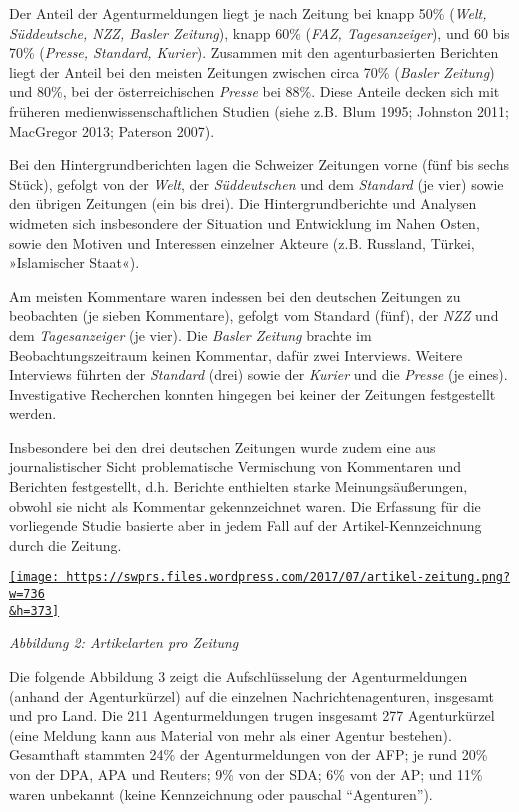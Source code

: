 Der Anteil der Agenturmeldungen liegt je nach Zeitung bei knapp 50\%
(\emph{Welt, Süddeutsche, NZZ, Basler Zeitung}), knapp 60\% (\emph{FAZ,
Tagesanzeiger}), und 60 bis 70\% (\emph{Presse, Standard, Kurier}).
Zusammen mit den agenturbasierten Berichten liegt der Anteil bei den
meisten Zeitungen zwischen circa 70\% (\emph{Basler Zeitung}) und 80\%,
bei der österreichischen \emph{Presse} bei 88\%. Diese Anteile decken
sich mit früheren medien­wissen­schaftlichen Studien (siehe z.B. Blum
1995; Johnston 2011; MacGregor 2013; Paterson 2007).

Bei den Hintergrundberichten lagen die Schweizer Zeitungen vorne (fünf
bis sechs Stück), gefolgt von der \emph{Welt}, der \emph{Süddeutschen}
und dem \emph{Standard} (je vier) sowie den übrigen Zeitungen (ein bis
drei). Die Hintergrundberichte und Analysen widmeten sich insbesondere
der Situation und Entwicklung im Nahen Osten, sowie den Motiven und
Interessen einzelner Akteure (z.B. Russland, Türkei, »Islamischer
Staat«).

Am meisten Kommentare waren indessen bei den deutschen Zeitungen zu
beobachten (je sieben Kommentare), gefolgt vom Standard (fünf), der
\emph{NZZ} und dem \emph{Tagesanzeiger} (je vier). Die \emph{Basler
Zeitung} brachte im Beobachtungszeitraum keinen Kommentar, dafür zwei
Interviews. Weitere Interviews führten der \emph{Standard} (drei) sowie
der \emph{Kurier} und die \emph{Presse} (je eines). Investigative
Recherchen konnten hingegen bei keiner der Zeitungen festgestellt
werden.

Insbesondere bei den drei deutschen Zeitungen wurde zudem eine aus
journalistischer Sicht problematische Vermischung von Kommentaren und
Berichten festgestellt, d.h. Berichte enthielten starke
Meinungs­äußerungen, obwohl sie nicht als Kommentar gekennzeichnet
waren. Die Erfassung für die vorliegende Studie basierte aber in jedem
Fall auf der Artikel-Kennzeichnung durch die Zeitung.

\href{https://swprs.files.wordpress.com/2017/07/artikel-zeitung.png}{\texttt{[image: https://swprs.files.wordpress.com/2017/07/artikel-zeitung.png?w=736\\\&h=373]}}

\emph{Abbildung 2: Artikelarten pro Zeitung}

Die folgende Abbildung 3 zeigt die Aufschlüsselung der Agenturmeldungen
(anhand der Agenturkürzel) auf die einzelnen Nachrichtenagenturen,
insgesamt und pro Land. Die 211 Agentur­meldungen trugen insgesamt 277
Agenturkürzel (eine Meldung kann aus Material von mehr als einer Agentur
bestehen). Gesamthaft stammten 24\% der Agenturmeldungen von der AFP; je
rund 20\% von der DPA, APA und Reuters; 9\% von der SDA; 6\% von der AP;
und 11\% waren unbekannt (keine Kennzeichnung oder pauschal
``Agenturen'').

